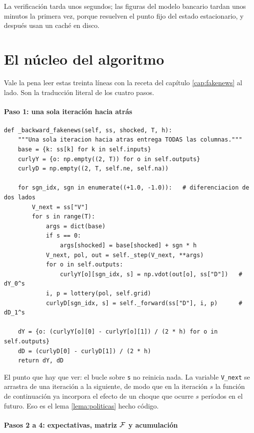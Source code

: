 La verificación tarda unos segundos; las figuras del modelo bancario tardan unos
minutos la primera vez, porque resuelven el punto fijo del estado estacionario, y
después usan un caché en disco.

\section{El núcleo del algoritmo}

Vale la pena leer estas treinta líneas con la receta del capítulo
\ref{cap:fakenews} al lado. Son la traducción literal de los cuatro pasos.

\paragraph{Paso 1: una sola iteración hacia atrás}

\begin{lstlisting}
def _backward_fakenews(self, ss, shocked, T, h):
    """Una sola iteracion hacia atras entrega TODAS las columnas."""
    base = {k: ss[k] for k in self.inputs}
    curlyY = {o: np.empty((2, T)) for o in self.outputs}
    curlyD = np.empty((2, T, self.ne, self.na))

    for sgn_idx, sgn in enumerate((+1.0, -1.0)):   # diferenciacion de dos lados
        V_next = ss["V"]
        for s in range(T):
            args = dict(base)
            if s == 0:
                args[shocked] = base[shocked] + sgn * h
            V_next, pol, out = self._step(V_next, **args)
            for o in self.outputs:
                curlyY[o][sgn_idx, s] = np.vdot(out[o], ss["D"])   # dY_0^s
            i, p = lottery(pol, self.grid)
            curlyD[sgn_idx, s] = self._forward(ss["D"], i, p)      # dD_1^s

    dY = {o: (curlyY[o][0] - curlyY[o][1]) / (2 * h) for o in self.outputs}
    dD = (curlyD[0] - curlyD[1]) / (2 * h)
    return dY, dD
\end{lstlisting}

El punto que hay que ver: el bucle sobre \texttt{s} no reinicia nada. La
variable \texttt{V\_next} se arrastra de una iteración a la siguiente, de modo
que en la iteración $s$ la función de continuación ya incorpora el efecto de un
choque que ocurre $s$ períodos en el futuro. Eso es el lema
\ref{lema:politicas} hecho código.

\paragraph{Pasos 2 a 4: expectativas, matriz $\mathcal{F}$ y acumulación}

